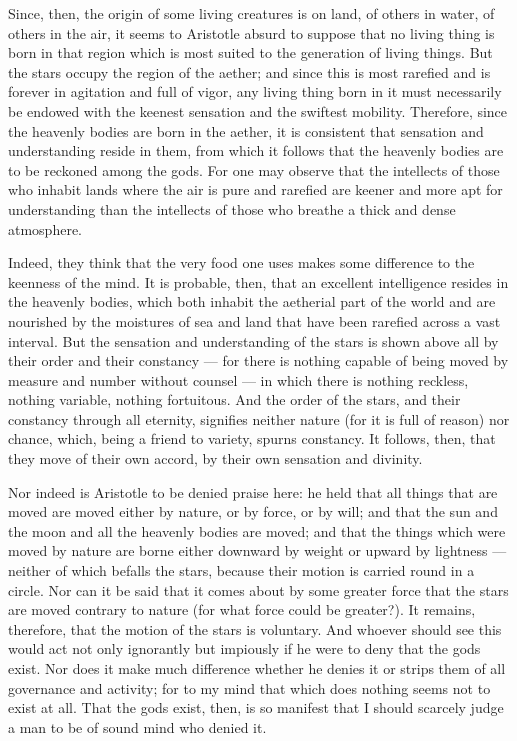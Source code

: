  Since, then, the origin of some living creatures is on land, of others in water, of others in the air, it seems to Aristotle absurd to suppose that no living thing is born in that region which is most suited to the generation of living things. But the stars occupy the region of the aether; and since this is most rarefied and is forever in agitation and full of vigor, any living thing born in it must necessarily be endowed with the keenest sensation and the swiftest mobility. Therefore, since the heavenly bodies are born in the aether, it is consistent that sensation and understanding reside in them, from which it follows that the heavenly bodies are to be reckoned among the gods. For one may observe that the intellects of those who inhabit lands where the air is pure and rarefied are keener and more apt for understanding than the intellects of those who breathe a thick and dense atmosphere.

 Indeed, they think that the very food one uses makes some difference to the keenness of the mind. It is probable, then, that an excellent intelligence resides in the heavenly bodies, which both inhabit the aetherial part of the world and are nourished by the moistures of sea and land that have been rarefied across a vast interval. But the sensation and understanding of the stars is shown above all by their order and their constancy — for there is nothing capable of being moved by measure and number without counsel — in which there is nothing reckless, nothing variable, nothing fortuitous. And the order of the stars, and their constancy through all eternity, signifies neither nature (for it is full of reason) nor chance, which, being a friend to variety, spurns constancy. It follows, then, that they move of their own accord, by their own sensation and divinity.

 Nor indeed is Aristotle to be denied praise here: he held that all things that are moved are moved either by nature, or by force, or by will; and that the sun and the moon and all the heavenly bodies are moved; and that the things which were moved by nature are borne either downward by weight or upward by lightness — neither of which befalls the stars, because their motion is carried round in a circle. Nor can it be said that it comes about by some greater force that the stars are moved contrary to nature (for what force could be greater?). It remains, therefore, that the motion of the stars is voluntary. And whoever should see this would act not only ignorantly but impiously if he were to deny that the gods exist. Nor does it make much difference whether he denies it or strips them of all governance and activity; for to my mind that which does nothing seems not to exist at all. That the gods exist, then, is so manifest that I should scarcely judge a man to be of sound mind who denied it.

